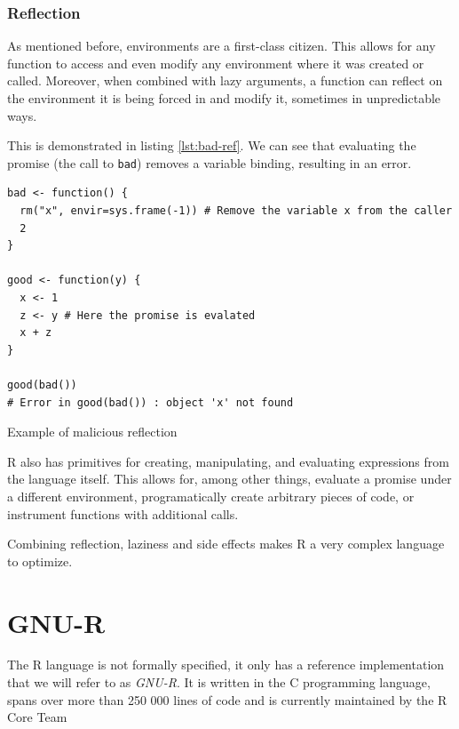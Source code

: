 \subsubsection*{Reflection}

As mentioned before, environments are a first-class citizen. This allows for any function to access and even modify any environment where it was created or called. Moreover, when combined with lazy arguments, a function can reflect on the environment it is being forced in and modify it, sometimes in unpredictable ways.

This is demonstrated in listing \ref{lst:bad-ref}. We can see that evaluating the promise (the call to \texttt{bad}) removes a variable binding, resulting in an error.

\begin{listing}
	\centering
	\begin{verbatim}
bad <- function() {
  rm("x", envir=sys.frame(-1)) # Remove the variable x from the caller
  2
}

good <- function(y) {
  x <- 1
  z <- y # Here the promise is evalated
  x + z
}

good(bad())
# Error in good(bad()) : object 'x' not found
  \end{verbatim}
	\caption{Example of malicious reflection\cite{r-melts-brains}}\label{lst:bad-ref}
\end{listing}

R also has primitives for creating, manipulating, and evaluating expressions from the language itself. This allows for, among other things, evaluate a promise under a different environment, programatically create arbitrary pieces of code, or instrument functions with additional calls.

Combining reflection, laziness and side effects makes R a very complex language to optimize.

\newpage
\section{GNU-R}

The R language is not formally specified, it only has a reference implementation that we will refer to as \textit{GNU-R}. It is written in the C programming language, spans over more than {250 000} lines of code and is currently maintained by the R Core Team

